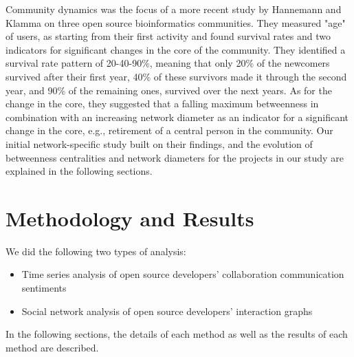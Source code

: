 \documentclass[12pt,letterpaper]{gthesis2}  %
\begin{document}
Community dynamics was the focus of a more recent study by Hannemann and Klamma \cite{Hannemann} on three open source bioinformatics communities. They measured "age" of users, as starting from their first activity and found survival rates and two indicators for significant changes in the core of the community. They identified a survival rate pattern of 20-40-90\%, meaning that only 20\% of the newcomers survived after their first year, 40\% of these survivors made it through the second year, and 90\% of the remaining ones, survived over the next years. As for the change in the core, they suggested that a falling maximum betweenness in combination with an increasing network diameter as an indicator for a significant change in the core, e.g., retirement of a central person in the community. Our initial network-specific study built on their findings, and the evolution of betweenness centralities and network diameters for the projects in our study are explained in the following sections. 

\section{Methodology and Results}
\label{methodology}

We did the following two types of analysis: 
\begin{itemize}
\item Time series analysis of open source developers’ collaboration communication sentiments
\item Social network analysis of open source developers’ interaction graphs
\end{itemize}
In the following sections, the details of each method as well as the results of each method are described.
\end{document}
